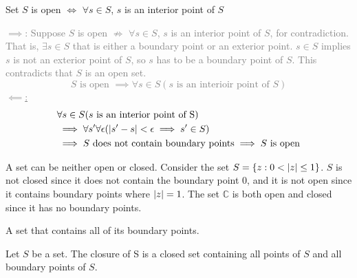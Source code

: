 \documentclass[12pt, english]{book}
\makeatletter
\renewenvironment{proof}[1][\proofname]{\par
	\pushQED{\qed}%
	\normalfont \topsep6\p@\@plus6\p@\relax
	\list{}{%
		\settowidth{\leftmargin}{\itshape\proofname:\hskip\labelsep}%
		\setlength{\labelwidth}{0pt}%
		\setlength{\itemindent}{-\leftmargin}%
	}%
	\item[\hskip\labelsep\itshape#1\@addpunct{:}]\ignorespaces
}{%
	\popQED\endlist\@endpefalse
}
\makeatother
\begin{document}
	\begin{theorem}
		Set $S$ is open $\iff$ $\forall s \in S$, $s$ is an interior point of $S$ 
	\end{theorem}
	\begin{proof}
		\textcolor{Grey}{
		\underline{$\implies$}:
		Suppose $S$ is open $\nRightarrow$ $\forall s \in S$, $s$ is an interior point of $S$, for contradiction. That is, $\exists s \in S$ that is either a boundary point or an exterior point. $s \in S$ implies $s$ is not an exterior point of $S$, so $s$ has to be a boundary point of $S$. This contradicts that $S$ is an open set. 
		$$S \text{ is open } \implies \forall s \in S (s \text{ is an interioir point of }S)$$
		\underline{$\impliedby$:}
		\begin{align*}
			&\forall s \in S (s \text{ is an interior point of S}) \\
			&\implies \forall s' \forall \epsilon (\abs{s'-s} < \epsilon \implies s' \in S)\\
			&\implies S \text{ does not contain boundary points} \implies S \text{ is open}
		\end{align*}
		}
	\end{proof}

	A set can be neither open or closed. Consider the set $S = \{z : 0 < \abs{z} \leq 1\}$. $S$ is not closed since it does not contain the boundary point $0$, and it is not open since it contains boundary points where $\abs{z} = 1$. The set $\mathbb{C}$ is both open and closed since it has no boundary points. 
	
	\begin{definition}
		\label{Closed Set Definition - Complex}
		A set that contains all of its boundary points. 
	\end{definition}

	\begin{definition}
		\label{Closure of a Set Definition - Complex}
		Let $S$ be a set. The closure of S is a closed set containing all points of $S$ and all boundary points of $S$. 
	\end{definition}
\end{document}
